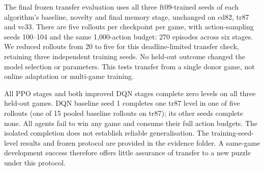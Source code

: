 The final frozen transfer evaluation uses all three ft09-trained seeds of each
algorithm's baseline, novelty and final memory stage, unchanged on cd82, tr87 and
vc33. There are five rollouts per checkpoint per game, with action-sampling seeds
100--104 and the same 1,000-action budget: 270 episodes across six stages.
We reduced rollouts from 20 to five for this deadline-limited transfer check,
retaining three independent training seeds. No held-out outcome changed the
model selection or parameters. This tests transfer from a single donor game,
not online adaptation or multi-game training.

All PPO stages and both improved DQN stages complete zero levels on all three
held-out games. DQN baseline seed 1 completes one tr87 level in one of five
rollouts (one of 15 pooled baseline rollouts on tr87); its other seeds complete
none. All agents fail to win any game and consume their full action budgets.
The isolated completion does not establish reliable generalisation. The
training-seed-level results and frozen protocol are provided in the evidence
folder. A same-game development success therefore offers little assurance of
transfer to a new puzzle under this protocol.

